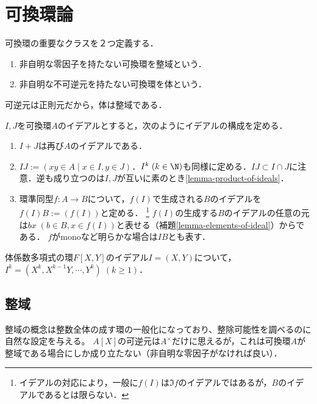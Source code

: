 \documentclass[uplatex,dvipdfmx]{jsreport}
\begin{document}
\section{可換環論}

\begin{tcolorbox}[colframe=ForestGreen, colback=ForestGreen!10!white,breakable,colbacktitle=ForestGreen!40!white,coltitle=black,fonttitle=\bfseries\sffamily,
title=]
    可換環の重要なクラスを２つ定義する．
    \begin{enumerate}
        \item 非自明な零因子を持たない可換環を整域という．
        \item 非自明な不可逆元を持たない可換環を体という．
    \end{enumerate}
    可逆元は正則元だから，体は整域である．
\end{tcolorbox}

\begin{notation}\label{notation-ideal-generated-by-image}
    $I,J$を可換環$A$のイデアルとすると，次のようにイデアルの構成を定める．
    \begin{enumerate}
        \item $I+J$は再び$A$のイデアルである．
        \item $IJ:=(xy\in A\mid x\in I,y\in J)$．$I^k\;(k\in\N)$も同様に定める．$IJ\subset I\cap J$に注意．逆も成り立つのは$I,J$が互いに素のとき\ref{lemma-product-of-ideals}．
        \item 環準同型$f:A\to B$について，$f(I)$で生成される$B$のイデアルを$f(I)B:=(f(I))$と定める．
        \footnote{イデアルの対応により，一般に$f(I)$は$\Im f$のイデアルではあるが，$B$のイデアルであるとは限らない．}
        $f(I)$の生成する$B$のイデアルの任意の元は$bx\;(b\in B,x\in f(I))$と表せる（補題\ref{lemma-elements-of-ideal}）からである．
        $f$がmonoなど明らかな場合は$IB$とも表す．
    \end{enumerate}
\end{notation}
\begin{example}[イデアルとしてのn次以上の式]
    体係数多項式の環$F[X,Y]$のイデアル$I=(X,Y)$について，$I^k=(X^k,X^{k-1}Y,\cdots,Y^k)\;(k\ge 1)$．
\end{example}

\subsection{整域}

\begin{tcolorbox}[colframe=ForestGreen, colback=ForestGreen!10!white,breakable,colbacktitle=ForestGreen!40!white,coltitle=black,fonttitle=\bfseries\sffamily,
title=非自明な零因子を持たない可換環]
    整域の概念は整数全体の成す環の一般化になっており、整除可能性を調べるのに自然な設定を与える。
    $A[X]$の可逆元は$A^\times$だけに思えるが，これは可換環$A$が整域である場合にしか成り立たない（非自明な零因子がなければ良い）．
\end{tcolorbox}
\end{document}
